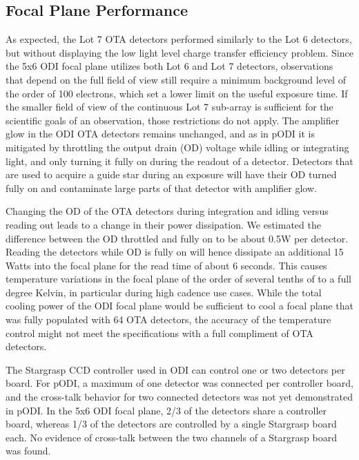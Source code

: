\documentclass[]{spieman}
\begin{document}
\subsection{Focal Plane  Performance}

As expected, the Lot 7 OTA detectors performed similarly to the Lot 6 detectors, but without
displaying the low light level charge transfer efficiency problem. Since the 5x6
ODI focal plane utilizes both Lot 6 and Lot 7 detectors, observations that
depend on the full field of view still require a minimum background level of the
order of 100 electrons, which set a lower limit on the useful exposure time. If
the smaller field of view of the continuous Lot 7 sub-array is sufficient for the
scientific goals of an observation, those
restrictions do not apply. The amplifier glow in the ODI OTA detectors remains
unchanged, and as in pODI it is mitigated by throttling the output drain  (OD) voltage
while idling or integrating light,  and only turning it fully on during the readout
of a detector. Detectors that are used to acquire a guide star during an exposure 
will have their OD turned fully on and contaminate large parts of that detector 
with amplifier glow.

Changing the OD of the OTA detectors during integration and idling versus reading out
leads to a change in their power dissipation. We estimated the difference
between the OD throttled and fully on to be about 0.5W per detector. Reading
the detectors while OD is fully on will hence dissipate an additional 15 Watts
into the focal plane for the read time of about 6 seconds. This causes
temperature variations in the focal plane of the order of several  tenths of
to a full degree Kelvin, in particular during high cadence use cases. While
the total cooling power of the ODI focal plane would be sufficient to cool a
focal plane that was fully populated with 64 OTA detectors, the accuracy of the
temperature control might not meet the specifications with a full compliment of 
OTA detectors.


The Stargrasp CCD controller\cite{onaka2008} used in ODI can control one or two
detectors per board. For pODI, a maximum of one detector was connected per controller 
board, and the cross-talk behavior for two connected detectors was not yet demonstrated
in pODI. In the 5x6 ODI focal plane, 2/3 of the detectors share a controller
board, whereas 1/3 of the detectors are controlled by a single Stargrasp board
each. No evidence of cross-talk between the two channels of a Stargrasp board
was found.
\end{document}
